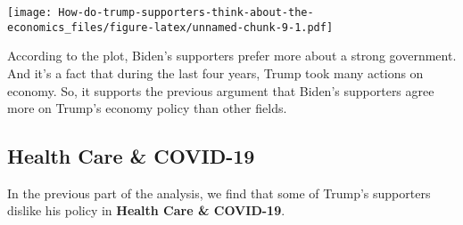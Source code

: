 \documentclass[
]{article}
\newenvironment{Shaded}{\begin{snugshade}}{\end{snugshade}}
\newcommand{\DataTypeTok}[1]{\textcolor[rgb]{0.13,0.29,0.53}{#1}}
\newcommand{\DecValTok}[1]{\textcolor[rgb]{0.00,0.00,0.81}{#1}}
\newcommand{\FloatTok}[1]{\textcolor[rgb]{0.00,0.00,0.81}{#1}}
\newcommand{\KeywordTok}[1]{\textcolor[rgb]{0.13,0.29,0.53}{\textbf{#1}}}
\newcommand{\NormalTok}[1]{#1}
\newcommand{\OperatorTok}[1]{\textcolor[rgb]{0.81,0.36,0.00}{\textbf{#1}}}
\newcommand{\OtherTok}[1]{\textcolor[rgb]{0.56,0.35,0.01}{#1}}
\newcommand{\StringTok}[1]{\textcolor[rgb]{0.31,0.60,0.02}{#1}}
\begin{document}
\texttt{[image: How-do-trump-supporters-think-about-the-economics\_files/figure-latex/unnamed-chunk-9-1.pdf]}

According to the plot, Biden's supporters prefer more about a strong
government. And it's a fact that during the last four years, Trump took
many actions on economy. So, it supports the previous argument that
Biden's supporters agree more on Trump's economy policy than other
fields.

\hypertarget{health-care-covid-19}{%
\subsection{Health Care \& COVID-19}\label{health-care-covid-19}}

In the previous part of the analysis, we find that some of Trump's
supporters dislike his policy in \textbf{Health Care \& COVID-19}.

\begin{Shaded}
\end{Shaded}
\end{document}
